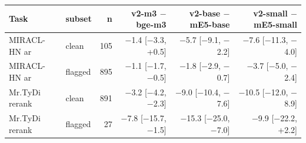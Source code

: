 \begin{tabular}{@{}llrrrr@{}}
\toprule
Task & subset & n & v2-m3 $-$ bge-m3 & v2-base $-$ mE5-base & v2-small $-$ mE5-small \\
\midrule
MIRACL-HN ar & clean & 105 & $-$1.4 [$-$3.3, +0.5] & $-$5.7 [$-$9.1, $-$2.2] & $-$7.6 [$-$11.3, $-$4.0] \\
MIRACL-HN ar & flagged & 895 & $-$1.1 [$-$1.7, $-$0.5] & $-$1.8 [$-$2.9, $-$0.7] & $-$3.7 [$-$5.0, $-$2.4] \\
Mr.TyDi rerank & clean & 891 & $-$3.2 [$-$4.2, $-$2.3] & $-$9.0 [$-$10.4, $-$7.6] & $-$10.5 [$-$12.0, $-$8.9] \\
Mr.TyDi rerank & flagged & 27 & $-$7.8 [$-$15.7, $-$1.5] & $-$15.3 [$-$25.0, $-$7.0] & $-$9.9 [$-$22.2, +2.2] \\
\bottomrule
\end{tabular}
